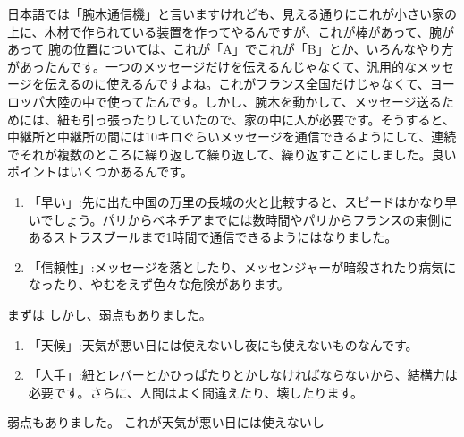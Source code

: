 日本語では「腕木通信機」と言いますけれども、見える通りにこれが小さい家の上に、木材で作られている装置を作ってやるんですが、これが棒があって、腕があって
腕の位置については、これが「A」でこれが「B」とか、いろんなやり方があったんです。一つのメッセージだけを伝えるんじゃなくて、汎用的なメッセージを伝えるのに使えるんですよね。これがフランス全国だけじゃなくて、ヨーロッパ大陸の中で使ってたんです。しかし、腕木を動かして、メッセージ送るためには、紐も引っ張ったりしていたので、家の中に人が必要です。そうすると、中継所と中継所の間には10キロぐらいメッセージを通信できるようにして、連続でそれが複数のところに繰り返して繰り返して、繰り返すことにしました。良いポイントはいくつかあるんです。
\begin{enumerate}
    \item 「早い」:先に出た中国の万里の長城の火と比較すると、スピードはかなり早いでしょう。パリからベネチアまでには数時間やパリからフランスの東側にあるストラスブールまで1時間で通信できるようにはなりました。
    \item 「信頼性」:メッセージを落としたり、メッセンジャーが暗殺されたり病気になったり、やむをえず色々な危険があります。
\end{enumerate}
まずは
しかし、弱点もありました。
\begin{enumerate}
    \item 「天候」:天気が悪い日には使えないし夜にも使えないものなんです。
    \item 「人手」:紐とレバーとかひっぱたりとかしなければならないから、結構力は必要です。さらに、人間はよく間違えたり、壊したります。
\end{enumerate}
弱点もありました。
これが天気が悪い日には使えないし

